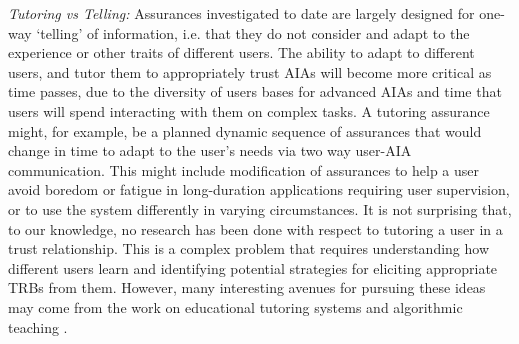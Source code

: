 \emph{Tutoring vs Telling:}
Assurances investigated to date are largely designed for one-way `telling' of information, i.e. that they do not consider and adapt to the experience or other traits of different users. The ability to adapt to different users, and tutor them to appropriately trust AIAs will become more critical as time passes, due to the diversity of users bases for advanced AIAs and time that users will spend interacting with them on complex tasks. A tutoring assurance might, for example, be a planned dynamic sequence of assurances that would change in time to adapt to the user's needs via two way user-AIA communication. This might include modification of assurances to help a user avoid boredom or fatigue in long-duration applications requiring user supervision, or to use the system differently in varying circumstances. It is not surprising that, to our knowledge, no research has been done with respect to tutoring a user in a trust relationship. This is a complex problem that requires understanding how different users learn and identifying potential strategies for eliciting appropriate TRBs from them. However, many interesting avenues for pursuing these ideas %
may come from the work on educational tutoring systems \cite{Wenger2014-ld} and algorithmic teaching  \cite{Balbach2009-jw}.
